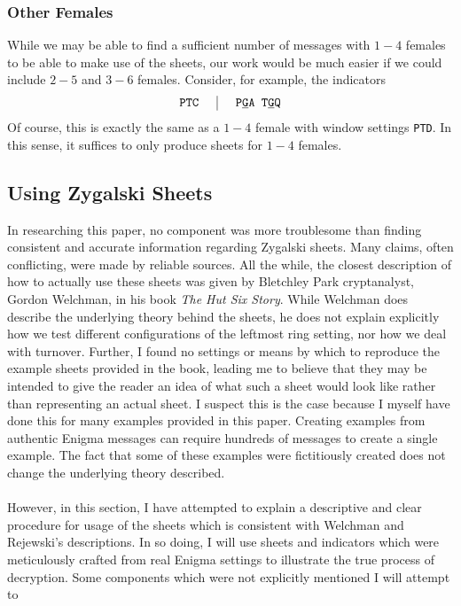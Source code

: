 \subsubsection{Other Females} While we may be able to find a
sufficient number of messages with $1-4$ females to be able to make
use of the sheets, our work would be much easier if we could include
$2-5$ and $3-6$ females. Consider, for example, the indicators
\[
	\setlength{\arraycolsep}{15pt}
	\begin{array}{c | c}
		\texttt{PTC} & \texttt{P}{\uline{\texttt{G}}}\texttt{A
			T}{\uline{\texttt{G}}}\texttt{Q}
	\end{array}
\]
Of course, this is exactly the same as a $1-4$ female with window
settings \texttt{PTD}. In this sense, it suffices to only produce
sheets for $1-4$ females.
\subsection{Using Zygalski Sheets}
In researching this paper, no component was more troublesome than
finding consistent and accurate information regarding Zygalski
sheets. Many claims, often conflicting, were made by reliable
sources. All the while, the closest description of how to actually
use these sheets was given by Bletchley Park cryptanalyst, Gordon Welchman, in his book \emph{The
	Hut Six Story}. While Welchman does describe the underlying theory
behind the sheets, he does not explain explicitly how we test
different configurations of the leftmost ring setting, nor how we
deal with turnover. Further, I found no settings or means by which to
reproduce the example sheets provided in the book, leading me to
believe that they may be intended to give the reader an idea of what
such a sheet would look like rather than representing an actual
sheet. I suspect this is the case because I myself have done this for
many examples provided in this paper. Creating examples from
authentic Enigma messages can require hundreds of messages to create
a single example. The fact that some of these examples were
fictitiously created does not change the underlying theory described.
\\\\However, in this section, I have attempted to explain a
descriptive and clear procedure for usage of the sheets which is
consistent with Welchman and Rejewski's descriptions. In so doing, I
will use sheets and indicators which were meticulously crafted from
real Enigma settings to illustrate the true process of decryption.
Some components which were not explicitly mentioned I will attempt to
